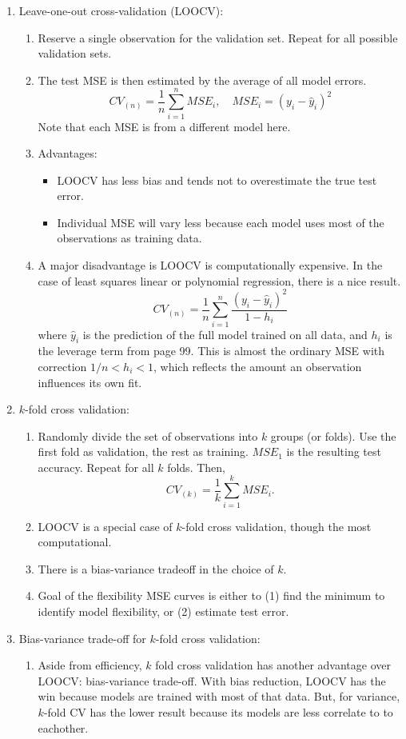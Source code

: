 \documentclass{article}
\begin{document}
\begin{enumerate}
\item Leave-one-out cross-validation (LOOCV):
\begin{enumerate}
\item Reserve a single observation for the validation set. Repeat for all possible validation sets. 
\item The test MSE is then estimated by the average of all model errors.
\[
CV_{(n)} = \frac{1}{n} \sum_{i=1}^n MSE_i, \quad MSE_i = (y_i-\hat{y}_i)^2
\]
Note that each MSE is from a different model here.
\item Advantages:
\begin{itemize}
\item LOOCV has less bias and tends not to overestimate the true test error. 
\item Individual MSE will vary less because each model uses most of the observations as training data.
\end{itemize}
\item A major disadvantage is LOOCV is computationally expensive. In the case of least squares linear or polynomial regression, there is a nice result.
\[
CV_{(n)} = \frac{1}{n} \sum_{i=1}^n \frac{(y_i-\hat{y}_i)^2}{1-h_i}
\]
where $\hat{y}_i$ is the prediction of the full model trained on all data, and $h_i$ is the leverage term from page 99. This is almost the ordinary MSE with correction $1/n<h_i<1$, which reflects the amount an observation influences its own fit.
\end{enumerate}

\item $k$-fold cross validation:
\begin{enumerate}
\item Randomly divide the set of observations into $k$ groups (or folds). Use the first fold as validation, the rest as training. $MSE_1$ is the resulting test accuracy. Repeat for all $k$ folds. Then,
\[
CV_{(k)} = \frac{1}{k} \sum_{i=1}^k MSE_i.
\]
\item LOOCV is a special case of $k$-fold cross validation, though the most computational.
\item There is a bias-variance tradeoff in the choice of $k$.
\item Goal of the flexibility MSE curves is either to (1) find the minimum to identify model flexibility, or (2) estimate test error.
\end{enumerate}

\item Bias-variance trade-off for $k$-fold cross validation:
\begin{enumerate}
\item Aside from efficiency, $k$ fold cross validation has another advantage over LOOCV: bias-variance trade-off. With bias reduction, LOOCV has the win because models are trained with most of that data. But, for variance, $k$-fold CV has the lower result because its models are less correlate to to eachother.
\end{enumerate}


\end{enumerate}
\end{document}
